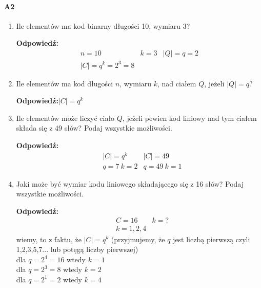 \documentclass[a4paper,12pt]{article}
\theoremstyle{definition}%
\theoremstyle{definition}
\theoremstyle{problem}
\begin{document}
\paragraph{A2}
\begin{enumerate}[label=\alph*)]
\item Ile elementów ma kod binarny długości 10, wymiaru 3?

\textbf{Odpowiedź:}
\begin{align*}
&n=10&k=3&|Q|=q=2&\\
&|C|=q^k=2^3=8
\end{align*}
\item Ile elementów ma kod długości $n$, wymiaru $k$, nad ciałem $Q$, jeżeli $|Q| = q$?

\textbf{Odpowiedź:}$|C|=q^k$
\item Ile elementów może liczyć ciało $Q$, jeżeli pewien kod liniowy nad tym ciałem składa się z 49 słów? Podaj wszystkie możliwości.

\textbf{Odpowiedź:}
\begin{align*}
&|C|=q^k&|C|=49\\
&q=7\ k=2& q=49\ k=1
\end{align*}
\item Jaki może być wymiar kodu liniowego składającego się z 16 słów? Podaj wszystkie możliwości.

\textbf{Odpowiedź:}
\begin{align*}
&C=16&k=?\\
&k=1,2,4
\end{align*}
wiemy, to z faktu, że $|C|=q^k$ (przyjmujemy, że $q$ jest liczbą pierwszą czyli 1,2,3,5,7... lub potęgą liczby pierwszej)\\
dla $q=2^4=16$ wtedy $k=1$\\
dla $q=2^3=8$ wtedy  $k=2$\\
dla $q=2^1=2$ wtedy $k=4$
\end{enumerate}
\end{document}
